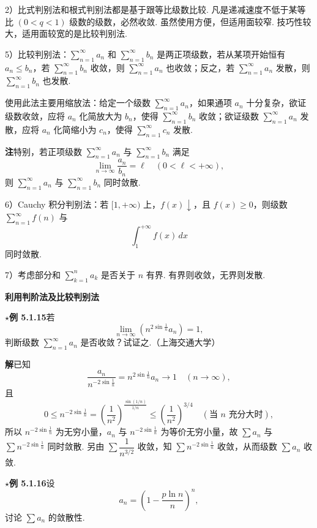 \documentclass[UTF8,12pt,a4paper,fontset=fandol]{ctexart}
\begin{document}
2）比式判别法和根式判别法都是基于跟等比级数比较. 凡是递减速度不低于某等比 $(0<q<1)$ 级数的级数，必然收敛. 虽然使用方便，但适用面较窄. 技巧性较大，适用面较宽的是比较判别法.

5）比较判别法：$\displaystyle\sum_{n=1}^\infty a_n$ 和 $\displaystyle\sum_{n=1}^\infty b_n$ 是两正项级数，若从某项开始恒有 $a_n\le b_n$，若 $\displaystyle\sum_{n=1}^\infty b_n$ 收敛，则 $\displaystyle\sum_{n=1}^\infty a_n$ 也收敛；反之，若 $\displaystyle\sum_{n=1}^\infty a_n$ 发散，则 $\displaystyle\sum_{n=1}^\infty b_n$ 也发散.

使用此法主要用缩放法：给定一个级数 $\displaystyle\sum_{n=1}^\infty a_n$，如果通项 $a_n$ 十分复杂，欲证级数收敛，应将 $a_n$ 化简放大为 $b_n$，使得 $\displaystyle\sum_{n=1}^\infty b_n$ 收敛；欲证级数 $\displaystyle\sum_{n=1}^\infty a_n$ 发散，应将 $a_n$ 化简缩小为 $c_n$，使得 $\displaystyle\sum_{n=1}^\infty c_n$ 发散.

\noindent\textbf{注}\quad 特别，若正项级数 $\displaystyle\sum_{n=1}^\infty a_n$ 与 $\displaystyle\sum_{n=1}^\infty b_n$ 满足
\[
  \lim_{n\to\infty}\frac{a_n}{b_n}=\ell\quad(0<\ell<+\infty),
\]
则 $\displaystyle\sum_{n=1}^\infty a_n$ 与 $\displaystyle\sum_{n=1}^\infty b_n$ 同时敛散.

6）Cauchy 积分判别法：若 $[1,+\infty)$ 上，$f(x)\downarrow$，且 $f(x)\ge0$，则级数 $\displaystyle\sum_{n=1}^\infty f(n)$ 与
\[
  \int_1^{+\infty} f(x)\,dx
\]
同时敛散.

7）考虑部分和 $\displaystyle\sum_{k=1}^n a_k$ 是否关于 $n$ 有界. 有界则收敛，无界则发散.

\noindent\textbf{利用判阶法及比较判别法}

\noindent\textbf{$\star$例 5.1.15}\quad 若
\[
  \lim_{n\to\infty}\left(n^{2\sin\frac1n}a_n\right)=1,
\]
判断级数 $\displaystyle\sum_{n=1}^\infty a_n$ 是否收敛？试证之.（上海交通大学）

\noindent\textbf{解}\quad 已知
\[
  \frac{a_n}{n^{-2\sin\frac1n}}=n^{2\sin\frac1n}a_n\to1\quad(n\to\infty),
\]
且
\[
  0\le n^{-2\sin\frac1n}=\left(\frac1{n^2}\right)^{\frac{\sin(1/n)}{1/n}}
  \le \left(\frac1{n^2}\right)^{3/4}\quad(\text{当 }n\text{ 充分大时}),
\]
所以 $n^{-2\sin\frac1n}$ 为无穷小量，$a_n$ 与 $n^{-2\sin\frac1n}$ 为等价无穷小量，故 $\sum a_n$ 与 $\sum n^{-2\sin\frac1n}$ 同时敛散. 另由 $\sum\dfrac1{n^{3/2}}$ 收敛，知 $\sum n^{-2\sin\frac1n}$ 收敛，从而级数 $\sum a_n$ 收敛.

\noindent\textbf{$\star$例 5.1.16}\quad 设
\[
  a_n=\left(1-\frac{p\ln n}{n}\right)^n,
\]
讨论 $\sum a_n$ 的敛散性.
\end{document}
